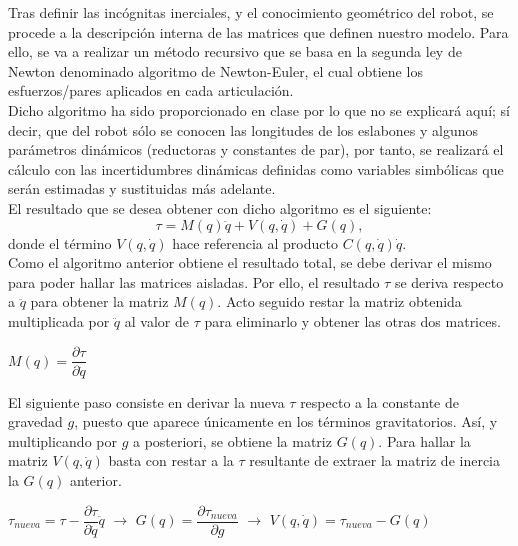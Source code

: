 \newpage

Tras definir las incógnitas inerciales, y el conocimiento geométrico del robot, se procede a la descripción interna de las
 matrices que definen nuestro modelo. Para ello, se va a realizar un método recursivo que se basa en la segunda ley de
 Newton denominado algoritmo de Newton-Euler, el cual obtiene los esfuerzos/pares aplicados en cada articulación.\\
 Dicho algoritmo ha sido proporcionado en clase por lo que no se explicará aquí; sí decir, que del robot sólo se conocen
 las longitudes de los eslabones y algunos parámetros dinámicos (reductoras y constantes de par), por tanto, se realizará el cálculo
 con las incertidumbres dinámicas definidas como variables simbólicas que serán estimadas y sustituidas más adelante.\\

El resultado que se desea obtener con dicho algoritmo es el siguiente:\\
\begin{equation}
\tau=M(q)\ddot{q}+V(q,\dot{q})+G(q),
\end{equation}
donde el término $V(q,\dot{q})$ hace referencia al producto $C(q,\dot{q})\dot{q}$.\\

Como el algoritmo anterior obtiene el resultado total, se debe derivar el mismo para poder hallar las matrices aisladas. Por ello, el resultado $\tau$ se deriva respecto a $\ddot{q}$ para obtener la matriz $M(q)$. Acto seguido restar la matriz obtenida multiplicada por $\ddot{q}$ al valor de $\tau$ para eliminarlo y obtener las otras dos matrices.\\
\begin{center}
$M(q)=\dfrac{\partial{\tau}}{\partial{\ddot{q}}}$
\end{center}

El siguiente paso consiste en derivar la nueva $\tau$ respecto a la constante de gravedad $g$, puesto que aparece únicamente en los términos gravitatorios. Así, y multiplicando por $g$ a posteriori, se obtiene la matriz $G(q)$. Para hallar la matriz $V(q,\dot{q})$ basta con restar a la $\tau$ resultante de extraer la matriz de inercia la $G(q)$ anterior.\\
\begin{center}
$\tau_{nueva}=\tau-\dfrac{\partial{\tau}}{\partial{\ddot{q}}}\ddot{q}$
$\rightarrow$
$G(q)=\dfrac{\partial{\tau_{nueva}}}{\partial{g}}$
$\rightarrow$
$V(q,\dot{q})=\tau_{nueva}-G(q)$
\end{center}

